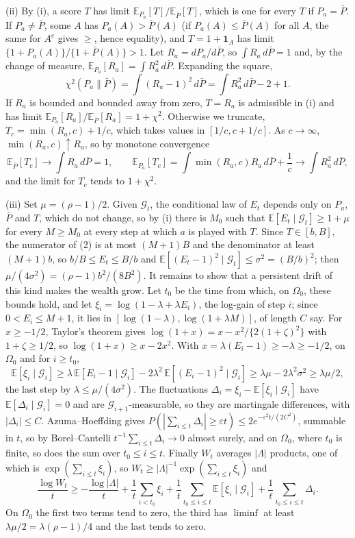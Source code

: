 \documentclass[11pt]{article}
\newcommand{\E}{\mathbb{E}}
\newcommand{\G}{\mathcal{G}}
\theoremstyle{remark}
\begin{document}
(ii) By (i), a score $T$ has limit $\E_{P_a}[T]/\E_{\bar P}[T]$, which is one
for every $T$ if $P_a = \bar P$. If $P_a \ne \bar P$, some $A$ has
$P_a(A) > \bar P(A)$ (if $P_a(A) \le \bar P(A)$ for all $A$, the same for $A^c$
gives $\ge$, hence equality), and $T = 1 + \mathbf 1_A$ has limit
$\{1 + P_a(A)\}/\{1 + \bar P(A)\} > 1$. Let $R_a = dP_a/d\bar P$, so
$\int R_a\, d\bar P = 1$ and, by the change of measure,
$\E_{P_a}[R_a] = \int R_a^2\, d\bar P$. Expanding the square,
\[
\chi^2(P_a\|\bar P) = \int (R_a - 1)^2\, d\bar P = \int R_a^2\, d\bar P - 2 + 1 .
\]
If $R_a$ is bounded and bounded away from zero, $T = R_a$ is admissible in (i)
and has limit $\E_{P_a}[R_a]/\E_{\bar P}[R_a] = 1 + \chi^2$. Otherwise we
truncate, $T_c = \min(R_a, c) + 1/c$, which takes values in $[1/c, c + 1/c]$.
As $c \to \infty$,
$\min(R_a, c) \uparrow R_a$, so by monotone convergence
\[
\E_{\bar P}[T_c] \to \int R_a\, d\bar P = 1,
\qquad
\E_{P_a}[T_c] = \int \min(R_a, c) R_a\, d\bar P + \frac1c \to \int R_a^2\, d\bar P,
\]
and the limit for $T_c$ tends to $1 + \chi^2$.

(iii) Set $\mu = (\rho - 1)/2$. Given $\G_t$, the conditional law of $E_t$
depends only on $P_a$, $\bar P$ and $T$, which do not change, so by (i) there
is $M_0$ such that $\E[E_t \mid \G_t] \ge 1 + \mu$ for every $M \ge M_0$ at
every step at which $a$ is played with $T$. Since $T \in [b, B]$, the
numerator of (2) is at most $(M+1)B$ and the denominator at least
$(M+1)b$, so $b/B \le E_t \le B/b$ and
$\E[(E_t - 1)^2 \mid \G_t] \le \sigma^2 = (B/b)^2$; then
$\mu/(4\sigma^2) = (\rho-1)b^2/(8B^2)$. It remains to show that a persistent
drift of this kind makes the wealth grow. Let $t_0$ be the time from which,
on $\Omega_0$, these bounds hold, and let
$\xi_i = \log(1 - \lambda + \lambda E_i)$, the log-gain of step $i$;
since $0 < E_i \le M+1$, it lies in $[\log(1-\lambda), \log(1+\lambda M)]$, of
length $C$ say. For $x \ge -1/2$, Taylor's theorem gives
$\log(1+x) = x - x^2/\{2(1+\zeta)^2\}$ with $1+\zeta \ge 1/2$, so
$\log(1+x) \ge x - 2x^2$. With $x = \lambda(E_i - 1) \ge -\lambda \ge -1/2$, on
$\Omega_0$ and for $i \ge t_0$,
\[
\E[\xi_i \mid \G_i] \ge \lambda\,\E[E_i - 1 \mid \G_i] - 2\lambda^2\,\E[(E_i-1)^2 \mid \G_i]
\ge \lambda\mu - 2\lambda^2\sigma^2 \ge \lambda\mu/2,
\]
the last step by $\lambda \le \mu/(4\sigma^2)$. The fluctuations
$\Delta_i = \xi_i - \E[\xi_i \mid \G_i]$ have $\E[\Delta_i \mid \G_i] = 0$ and are
$\G_{i+1}$-measurable, so they are martingale differences, with
$|\Delta_i| \le C$. Azuma--Hoeffding \citep{azuma1967weighted} gives
$P(|\sum_{i \le t}\Delta_i| \ge \varepsilon t) \le 2e^{-\varepsilon^2 t/(2C^2)}$,
summable in $t$, so by Borel--Cantelli $t^{-1}\sum_{i \le t}\Delta_i \to 0$
almost surely, and on $\Omega_0$, where $t_0$ is finite, so does the sum over
$t_0 \le i \le t$. Finally $W_t$ averages $|\Lambda|$ products, one of which is
$\exp(\sum_{i \le t}\xi_i)$, so $W_t \ge |\Lambda|^{-1}\exp(\sum_{i \le t}\xi_i)$ and
\[
\frac{\log W_t}{t} \ge -\frac{\log|\Lambda|}{t} + \frac1t\sum_{i < t_0} \xi_i
+ \frac1t\sum_{t_0 \le i \le t} \E[\xi_i \mid \G_i] + \frac1t\sum_{t_0 \le i \le t}\Delta_i .
\]
On $\Omega_0$ the first two terms tend to zero, the third has $\liminf$ at
least $\lambda\mu/2 = \lambda(\rho-1)/4$ and the last tends to zero.
\end{document}
